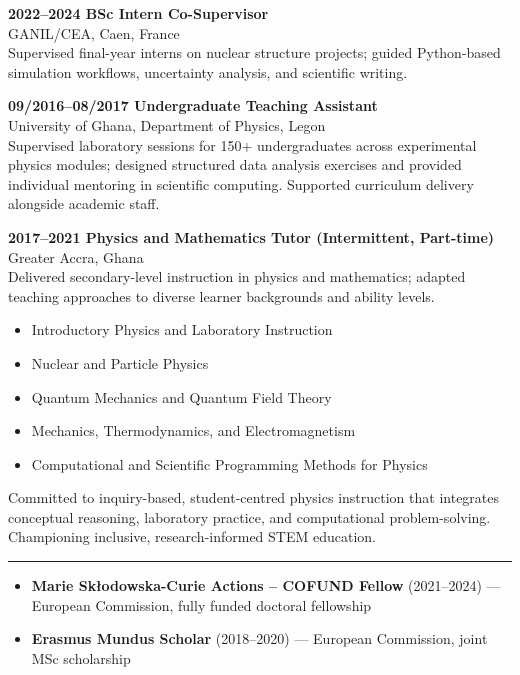 \documentclass[10pt,a4paper]{article}
\newcommand{\cvsection}[1]{%
  \par\vspace{8pt}%
  \noindent{\large\bfseries\textcolor{maincolor}{#1}}\par
  {\color{maincolor}\rule{\linewidth}{0.6pt}}%
  \vspace{4pt}%
}
\newcommand{\cvsubsection}[1]{%
  \par\vspace{4pt}%
  \noindent{\normalsize\bfseries\textcolor{maincolor}{#1}}%
  \vspace{2pt}%
}
\begin{document}
{\footnotesize
\textbf{2022--2024 \quad BSc Intern Co-Supervisor}\\
GANIL/CEA, Caen, France\\
Supervised final-year interns on nuclear structure projects; guided
Python-based simulation workflows, uncertainty analysis, and scientific writing.

\vspace{3pt}
\textbf{09/2016--08/2017 \quad Undergraduate Teaching Assistant}\\
University of Ghana, Department of Physics, Legon\\
Supervised laboratory sessions for 150+ undergraduates across
experimental physics modules; designed structured data analysis
exercises and provided individual mentoring in scientific computing.
Supported curriculum delivery alongside academic staff.

\vspace{3pt}
\textbf{2017--2021 \quad Physics and Mathematics Tutor (Intermittent, Part-time)}\\
Greater Accra, Ghana\\
Delivered secondary-level instruction in physics and mathematics;
adapted teaching approaches to diverse learner backgrounds and
ability levels.
}

\cvsubsection{Teaching Areas}

{\footnotesize
\begin{itemize}[leftmargin=1.4em, itemsep=2pt, topsep=2pt,
                label=\textbullet]
  \item Introductory Physics and Laboratory Instruction
  \item Nuclear and Particle Physics
  \item Quantum Mechanics and Quantum Field Theory
  \item Mechanics, Thermodynamics, and Electromagnetism
  \item Computational and Scientific Programming Methods for Physics
\end{itemize}
}

\cvsubsection{Teaching Philosophy}

{\footnotesize
Committed to inquiry-based, student-centred physics instruction that
integrates conceptual reasoning, laboratory practice, and
computational problem-solving. Championing inclusive, research-informed STEM education.
}

\cvsection{Fellowships and Awards}

{\footnotesize
\begin{itemize}[leftmargin=1.4em, itemsep=3pt, topsep=2pt,
                label=\textbullet]
  \item \textbf{Marie Sk\l{}odowska-Curie Actions -- COFUND Fellow}
        (2021--2024) --- European Commission, fully funded doctoral
        fellowship
  \item \textbf{Erasmus Mundus Scholar} (2018--2020) ---
        European Commission, joint MSc scholarship
\end{itemize}
}
\end{document}
